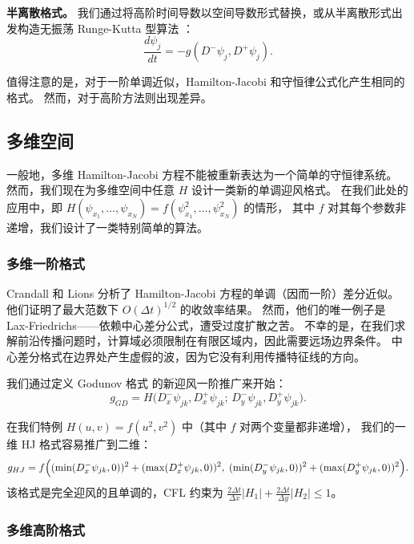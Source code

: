 \documentclass[11pt,a4paper]{article}
\begin{document}
\textbf{半离散格式。}
我们通过将高阶时间导数以空间导数形式替换，或从半离散形式出发构造无振荡 Runge-Kutta 型算法 \cite{shu1987}：
\begin{equation}
\frac{d\psi_j}{dt} = -g(D^-\psi_j, D^+\psi_j).
\end{equation}

值得注意的是，对于一阶单调近似，Hamilton-Jacobi 和守恒律公式化产生相同的格式。
然而，对于高阶方法则出现差异。

\subsection{多维空间}

一般地，多维 Hamilton-Jacobi 方程不能被重新表达为一个简单的守恒律系统。
然而，我们现在为多维空间中任意 $H$ 设计一类新的单调迎风格式。
在我们此处的应用中，即 $H(\psi_{x_1}, \ldots, \psi_{x_N}) = f(\psi_{x_1}^2, \ldots, \psi_{x_N}^2)$ 的情形，
其中 $f$ 对其每个参数非递增，我们设计了一类特别简单的算法。

\subsubsection{多维一阶格式}

Crandall 和 Lions \cite{crandall1984} 分析了 Hamilton-Jacobi 方程的单调（因而一阶）差分近似。
他们证明了最大范数下 $O(\Delta t)^{1/2}$ 的收敛率结果。
然而，他们的唯一例子是 Lax-Friedrichs——依赖中心差分公式，遭受过度扩散之苦。
不幸的是，在我们求解前沿传播问题时，计算域必须限制在有限区域内，因此需要远场边界条件。
中心差分格式在边界处产生虚假的波，因为它没有利用传播特征线的方向。

我们通过定义 Godunov 格式 \cite{godunov1959, osher1984} 的新迎风一阶推广来开始：
\begin{equation}
g_{GD} = H\bigl(D_x^-\psi_{jk}, D_x^+\psi_{jk};\, D_y^-\psi_{jk}, D_y^+\psi_{jk}\bigr).
\label{eq:3.9}
\end{equation}

在我们特例 $H(u,v) = f(u^2, v^2)$ 中（其中 $f$ 对两个变量都非递增），
我们的一维 HJ 格式容易推广到二维：
\begin{equation}
g_{HJ} = f\Bigl(
    (\min(D_x^-\psi_{jk}, 0))^2 + (\max(D_x^+\psi_{jk}, 0))^2,\;
    (\min(D_y^-\psi_{jk}, 0))^2 + (\max(D_y^+\psi_{jk}, 0))^2
\Bigr).
\label{eq:3.11}
\end{equation}
该格式是完全迎风的且单调的，CFL 约束为 $\frac{2\Delta t}{\Delta x}|H_1| + \frac{2\Delta t}{\Delta y}|H_2| \leq 1$。

\subsubsection{多维高阶格式}
\end{document}
